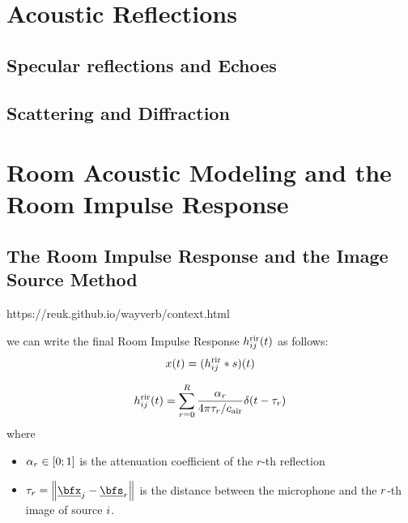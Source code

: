 

\section{Acoustic Reflections}
\subsection{Specular reflections and Echoes}

\subsection{Scattering and Diffraction}

\section{Room Acoustic Modeling and the Room Impulse Response}

\subsection{The Room Impulse Response and the Image Source Method}
https://reuk.github.io/wayverb/context.html

 we can write the final Room Impulse Response $h^{\text{rir}}_{ij}(t)$ as follows:
\begin{equation}
    x(t) = (h^{\text{rir}}_{ij} \ast s)(t)
\end{equation}

\begin{equation}
    \rir_{ij}(t) = \sum_{r=0}^{R} \frac{\alpha_r}{4 \pi \tau_r / \cair} \delta \kparen{t - \tau_r}
\end{equation}
where
\begin{itemize}
    \item $\alpha_r \in \kintervcc{0}{1}$ is the attenuation coefficient of the $r$-th reflection
    \item $\tau_r = \norm{\positionMicrophone_\idxMic - \positionSource_\idxEch}$ is the distance between the microphone and the $r$-th image of source $i$.
\end{itemize}

